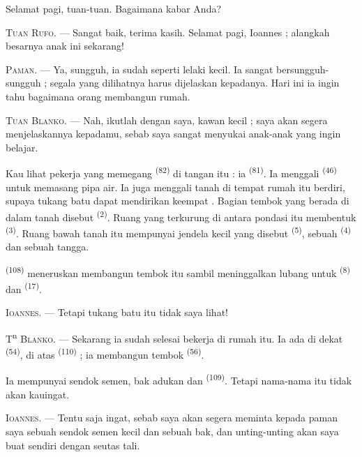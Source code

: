 Selamat pagi, tuan-tuan. Bagaimana kabar Anda?

\textsc{Tuan Rufo}. --- Sangat baik, terima kasih. Selamat pagi,
Ioannes ; alangkah besarnya anak ini sekarang!

\textsc{Paman}. --- Ya, sungguh, ia sudah seperti lelaki kecil. Ia
sangat bersungguh-sungguh ; segala yang dilihatnya harus dijelaskan
kepadanya. Hari ini ia ingin tahu bagaimana orang membangun rumah.

\VUsaut{3.0mm}

\textsc{Tuan Blanko}. --- Nah, ikutlah dengan saya, kawan kecil ; saya
akan segera menjelaskannya kepadamu, sebab saya sangat menyukai
anak-anak yang ingin belajar.

Kau lihat pekerja yang memegang  \textsuperscript{(82)}
di tangan itu : ia  \textsuperscript{(81)}. Ia
menggali  \textsuperscript{(46)} untuk memasang pipa air.
Ia juga menggali tanah di tempat rumah itu berdiri, supaya tukang batu
dapat mendirikan keempat . Bagian tembok yang berada
di dalam tanah disebut  \textsuperscript{(2)}. Ruang
yang terkurung di antara pondasi itu membentuk  \textsuperscript{(3)}. Ruang bawah tanah itu mempunyai jendela
kecil yang disebut 
\textsuperscript{(5)}, sebuah  \textsuperscript{(4)} dan
sebuah tangga.

 \textsuperscript{(108)} meneruskan membangun
tembok itu sambil meninggalkan lubang untuk 
\textsuperscript{(8)} dan  \textsuperscript{(17)}.

\textsc{Ioannes}. --- Tetapi tukang batu itu tidak saya lihat!

T\textsuperscript{n} \textsc{Blanko}. --- Sekarang ia sudah selesai
bekerja di rumah itu. Ia ada di dekat 
\textsuperscript{(54)}, di atas 
\textsuperscript{(110)} ; ia membangun tembok 
\textsuperscript{(56)}.

Ia mempunyai sendok semen, bak adukan dan 
\textsuperscript{(109)}. Tetapi nama-nama itu tidak akan kauingat.

\textsc{Ioannes}. --- Tentu saja ingat, sebab saya akan segera meminta
kepada paman saya sebuah sendok semen kecil dan sebuah bak, dan
unting-unting akan saya buat sendiri dengan seutas tali.

